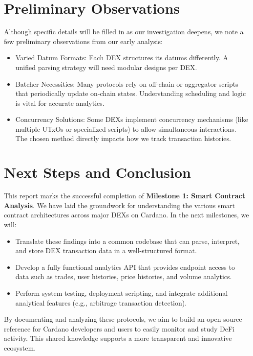\documentclass{article}
\begin{document}
\section{Preliminary Observations}
\label{sec:observations}
Although specific details will be filled in as our investigation deepens, we note a few preliminary observations from our early analysis:
\begin{itemize}
    \item Varied Datum Formats: Each DEX structures its datums differently. A unified parsing strategy will need modular designs per DEX.
    \item Batcher Necessities: Many protocols rely on off-chain or aggregator scripts that periodically update on-chain states. Understanding scheduling and logic is vital for accurate analytics.
    \item Concurrency Solutions: Some DEXs implement concurrency mechanisms (like multiple UTxOs or specialized scripts) to allow simultaneous interactions. The chosen method directly impacts how we track transaction histories.
\end{itemize}

\section{Next Steps and Conclusion}
\label{sec:conclusion}
This report marks the successful completion of \textbf{Milestone 1: Smart Contract Analysis}. We have laid the groundwork for understanding the various smart contract architectures across major DEXs on Cardano. In the next milestones, we will:

\begin{itemize}
    \item Translate these findings into a common codebase that can parse, interpret, and store DEX transaction data in a well-structured format.
    \item Develop a fully functional analytics API that provides endpoint access to data such as trades, user histories, price histories, and volume analytics.
    \item Perform system testing, deployment scripting, and integrate additional analytical features (e.g., arbitrage transaction detection).
\end{itemize}

By documenting and analyzing these protocols, we aim to build an open-source reference for Cardano developers and users to easily monitor and study DeFi activity. This shared knowledge supports a more transparent and innovative ecosystem.
\end{document}
